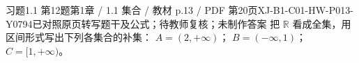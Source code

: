 \par\noindent\begin{minipage}{\linewidth}
\begin{bankitem}{习题1.1 第12题}{第1章 / 1.1 集合 / 教材 p.13 / PDF 第20页}{XJ-B1-C01-HW-P013-Y0794}{已对照原页转写题干及公式；待教师复核；未制作答案}
把 $\mathbb R$ 看成全集，用区间形式写出下列各集合的补集：
$A=(2,+\infty)$；
$B=(-\infty,1)$；
$C=[1,+\infty)$。
\end{bankitem}
\end{minipage}\par\medskip
